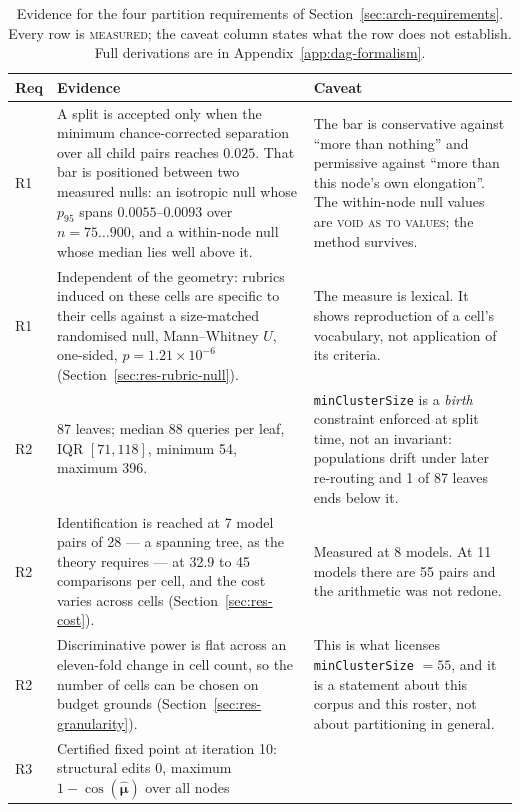 \begin{table}[htbp]
\centering
\caption{Evidence for the four partition requirements of
Section~\ref{sec:arch-requirements}. Every row is \textsc{measured};
the caveat column states what the row does not establish. Full
derivations are in Appendix~\ref{app:dag-formalism}.}
\label{tab:requirements-evidence}
\begin{tabular}{p{0.7cm}p{5.6cm}p{5.8cm}}
\toprule
Req & Evidence & Caveat \\
\midrule
R1
& A split is accepted only when the minimum chance-corrected separation
over all child pairs reaches $0.025$. That bar is positioned between two
measured nulls: an isotropic null whose $p_{95}$ spans $0.0055$--$0.0093$
over $n = 75\ldots900$, and a within-node null whose median lies well
above it.
& The bar is conservative against ``more than nothing'' and permissive
against ``more than this node's own elongation''. The within-node null
values are \textsc{void as to values}; the method survives. \\
\addlinespace
R1
& Independent of the geometry: rubrics induced on these cells are
specific to their cells against a size-matched randomised null,
Mann--Whitney $U$, one-sided, $p = 1.21\times10^{-6}$
(Section~\ref{sec:res-rubric-null}).
& The measure is lexical. It shows reproduction of a cell's vocabulary,
not application of its criteria. \\
\addlinespace
R2
& 87 leaves; median 88 queries per leaf, IQR $[71, 118]$, minimum 54,
maximum 396.
& \texttt{minClusterSize} is a \emph{birth} constraint enforced at split
time, not an invariant: populations drift under later re-routing and
1 of 87 leaves ends below it. \\
\addlinespace
R2
& Identification is reached at 7 model pairs of 28 --- a spanning tree,
as the theory requires --- at 32.9 to 45 comparisons per cell, and the
cost varies across cells (Section~\ref{sec:res-cost}).
& Measured at 8 models. At 11 models there are 55 pairs and the
arithmetic was not redone. \\
\addlinespace
R2
& Discriminative power is flat across an eleven-fold change in cell
count, so the number of cells can be chosen on budget grounds
(Section~\ref{sec:res-granularity}).
& This is what licenses \texttt{minClusterSize} $= 55$, and it is a
statement about this corpus and this roster, not about partitioning in
general. \\
\addlinespace
R3
& Certified fixed point at iteration 10: structural edits $0$, maximum
$1 - \cos(\hat{\boldsymbol{\mu}})$ over all nodes

\end{tabular}
\end{table}
